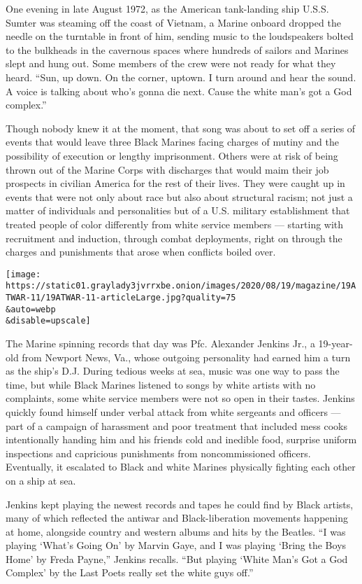 One evening in late August 1972, as the American tank-landing ship
U.S.S. Sumter was steaming off the coast of Vietnam, a Marine onboard
dropped the needle on the turntable in front of him, sending music to
the loudspeakers bolted to the bulkheads in the cavernous spaces where
hundreds of sailors and Marines slept and hung out. Some members of the
crew were not ready for what they heard. ``Sun, up down. On the corner,
uptown. I turn around and hear the sound. A voice is talking about who's
gonna die next. Cause the white man's got a God complex.''

Though nobody knew it at the moment, that song was about to set off a
series of events that would leave three Black Marines facing charges of
mutiny and the possibility of execution or lengthy imprisonment. Others
were at risk of being thrown out of the Marine Corps with discharges
that would maim their job prospects in civilian America for the rest of
their lives. They were caught up in events that were not only about race
but also about structural racism; not just a matter of individuals and
personalities but of a U.S. military establishment that treated people
of color differently from white service members --- starting with
recruitment and induction, through combat deployments, right on through
the charges and punishments that arose when conflicts boiled over.

\texttt{[image: https://static01.graylady3jvrrxbe.onion/images/2020/08/19/magazine/19ATWAR-11/19ATWAR-11-articleLarge.jpg?quality=75\\\&auto=webp\\\&disable=upscale]}

The Marine spinning records that day was Pfc. Alexander Jenkins Jr., a
19-year-old from Newport News, Va., whose outgoing personality had
earned him a turn as the ship's D.J. During tedious weeks at sea, music
was one way to pass the time, but while Black Marines listened to songs
by white artists with no complaints, some white service members were not
so open in their tastes. Jenkins quickly found himself under verbal
attack from white sergeants and officers --- part of a campaign of
harassment and poor treatment that included mess cooks intentionally
handing him and his friends cold and inedible food, surprise uniform
inspections and capricious punishments from noncommissioned officers.
Eventually, it escalated to Black and white Marines physically fighting
each other on a ship at sea.

Jenkins kept playing the newest records and tapes he could find by Black
artists, many of which reflected the antiwar and Black-liberation
movements happening at home, alongside country and western albums and
hits by the Beatles. ``I was playing `What's Going On' by Marvin Gaye,
and I was playing `Bring the Boys Home' by Freda Payne,'' Jenkins
recalls. ``But playing `White Man's Got a God Complex' by the Last Poets
really set the white guys off.''

